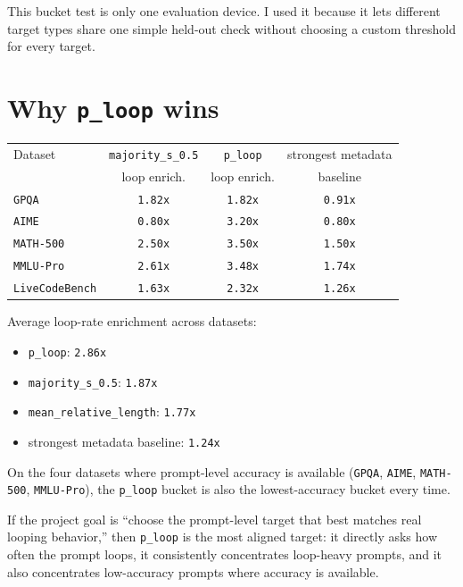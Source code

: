 \documentclass[11pt]{article}
\begin{document}
This bucket test is only one evaluation device. I used it because it lets
different target types share one simple held-out check without choosing a
custom threshold for every target.

\section*{Why \texttt{p\_loop} wins}
\begin{center}
\begin{tabular}{>{\raggedright\arraybackslash}p{1.55in}ccc}
\toprule
Dataset & \texttt{majority\_s\_0.5} & \texttt{p\_loop} & strongest metadata \\
 & loop enrich. & loop enrich. & baseline \\
\midrule
\texttt{GPQA} & \texttt{1.82x} & \texttt{1.82x} & \texttt{0.91x} \\
\texttt{AIME} & \texttt{0.80x} & \texttt{3.20x} & \texttt{0.80x} \\
\texttt{MATH-500} & \texttt{2.50x} & \texttt{3.50x} & \texttt{1.50x} \\
\texttt{MMLU-Pro} & \texttt{2.61x} & \texttt{3.48x} & \texttt{1.74x} \\
\texttt{LiveCodeBench} & \texttt{1.63x} & \texttt{2.32x} & \texttt{1.26x} \\
\bottomrule
\end{tabular}
\end{center}

Average loop-rate enrichment across datasets:
\begin{itemize}[leftmargin=1.5em]
\item \texttt{p\_loop}: \texttt{2.86x}
\item \texttt{majority\_s\_0.5}: \texttt{1.87x}
\item \texttt{mean\_relative\_length}: \texttt{1.77x}
\item strongest metadata baseline: \texttt{1.24x}
\end{itemize}

On the four datasets where prompt-level accuracy is available
(\texttt{GPQA}, \texttt{AIME}, \texttt{MATH-500}, \texttt{MMLU-Pro}), the
\texttt{p\_loop} bucket is also the lowest-accuracy bucket every time.

If the project goal is ``choose the prompt-level target that best matches real
looping behavior,'' then \texttt{p\_loop} is the most aligned target: it
directly asks how often the prompt loops, it consistently concentrates
loop-heavy prompts, and it also concentrates low-accuracy prompts where
accuracy is available.
\end{document}
